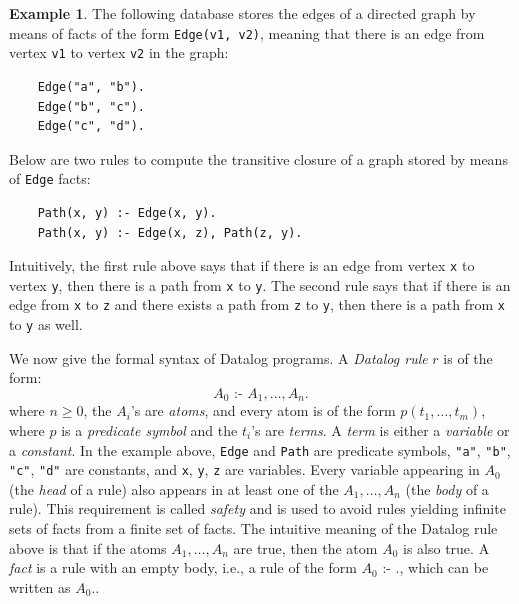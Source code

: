 \documentclass[11pt]{report}
\theoremstyle{definition}
\newtheorem{exmp}{Example}[chapter]
\begin{document}
\begin{exmp}
  The following database stores the edges of a directed graph by means of facts of the form
  \texttt{Edge(v1, v2)}, meaning that there is an edge from vertex \texttt{v1} to vertex \texttt{v2} in the graph:
  \begin{verbatim}
    Edge("a", "b").
    Edge("b", "c").
    Edge("c", "d").
  \end{verbatim}
  Below are two rules to compute the transitive closure of a graph stored by means of \texttt{Edge} facts:
  \begin{verbatim}
    Path(x, y) :- Edge(x, y).
    Path(x, y) :- Edge(x, z), Path(z, y).
  \end{verbatim}
  Intuitively, the first rule above says that if there is an edge from vertex \texttt{x} to vertex \texttt{y}, then there is a path from \texttt{x} to \texttt{y}. The second rule says that if there is an edge from \texttt{x} to \texttt{z} and there exists a path from \texttt{z} to \texttt{y}, then there is a path from \texttt{x} to \texttt{y} as well.
\end{exmp}
\label{exmp:tc}

We now give the formal syntax of Datalog programs. A \textit{Datalog rule} $r$ is of the form: $$A_0 \text{ :- } A_1, \ldots, A_n.$$ where $n \geq 0$, the $A_i$'s are \textit{atoms}, and every atom is of the form $p(t_1, \ldots, t_m)$, where $p$ is a \textit{predicate symbol} and the $t_i$'s are \textit{terms}. A \textit{term} is either a \textit{variable} or a \textit{constant}. In the example above, \texttt{Edge} and \texttt{Path} are predicate symbols, \texttt{"a"}, \texttt{"b"}, \texttt{"c"}, \texttt{"d"} are constants, and \texttt{x}, \texttt{y}, \texttt{z} are variables. Every variable appearing in $A_0$ (the \textit{head} of a rule) also appears in at least one of the $A_1, \ldots, A_n$ (the \textit{body} of a rule). This requirement is called \textit{safety} and is used to avoid rules yielding infinite sets of facts from a finite set of facts. The intuitive meaning of the Datalog rule above is that if the atoms $A_1, \ldots, A_n$ are true, then the atom $A_0$ is also true. A \textit{fact} is a rule with an empty body, i.e., a rule of the form $A_0 \text{ :- }.$, which can be written as $A_0.$.
\end{document}

